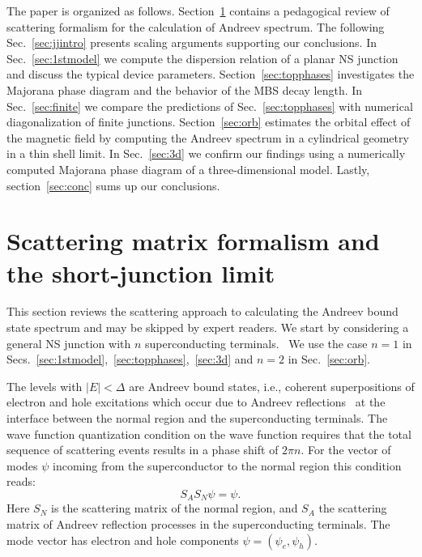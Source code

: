 The paper is organized as follows.
Section~\ref{sec:formalism} contains a pedagogical review of scattering formalism for the calculation of Andreev spectrum.
The following Sec.~\ref{sec:jjintro} presents scaling arguments supporting our conclusions.
In Sec.~\ref{sec:1stmodel} we compute the dispersion relation of a planar NS junction and discuss the typical device parameters.
Section~\ref{sec:topphases} investigates the Majorana phase diagram and the behavior of the MBS decay length.
In Sec.~\ref{sec:finite} we compare the predictions of Sec.~\ref{sec:topphases} with numerical diagonalization of finite junctions.
Section~\ref{sec:orb} estimates the orbital effect of the magnetic field by computing the Andreev spectrum in a cylindrical geometry in a thin shell limit.
In Sec.~\ref{sec:3d} we confirm our findings using a numerically computed Majorana phase diagram of a three-dimensional model.
Lastly, section~\ref{sec:conc} sums up our conclusions.

\section{Scattering matrix formalism and the short-junction limit}
\label{sec:formalism}
This section reviews the scattering approach to calculating the Andreev bound state spectrum and may be skipped by expert readers.
We start by considering a general NS junction with $n$ superconducting terminals.~\cite{Heck2014}
We use the case $n=1$ in Secs.~\ref{sec:1stmodel},~\ref{sec:topphases},~\ref{sec:3d} and $n=2$ in Sec.~\ref{sec:orb}.

The levels with $|E|<\Delta$ are Andreev bound states, i.e., coherent superpositions of electron and hole excitations which occur due to Andreev reflections~\cite{Andreev1964} at the interface between the normal region and the superconducting terminals.
The wave function quantization condition on the wave function requires that the total sequence of scattering events results in a phase shift of $2\pi n$.
For the vector of modes $\psi$ incoming from the superconductor to the normal region this condition reads:
\begin{equation}\label{bound}
S_A S_N\psi=\psi.
\end{equation}
Here $S_N$ is the scattering matrix of the normal region, and $S_A$ the scattering matrix of Andreev reflection processes in the superconducting terminals.
The mode vector has electron and hole components $\psi=(\psi_e, \psi_h)$.

